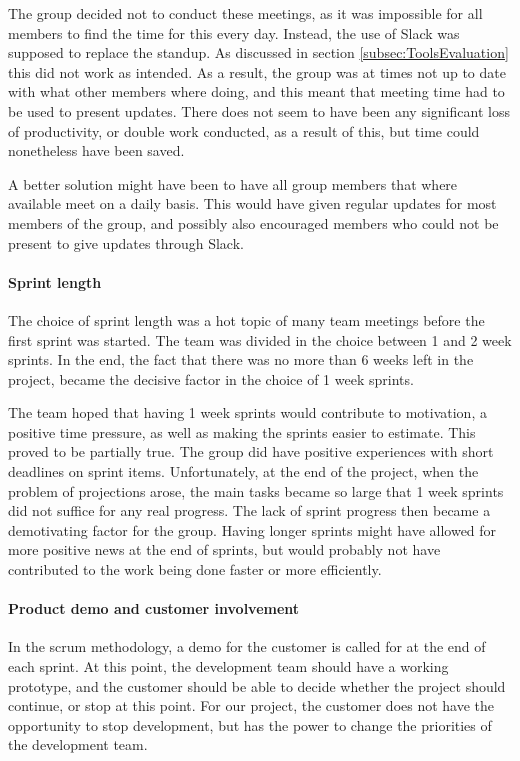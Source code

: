 \documentclass[11pt,a4paper,titlepage,oneside]{report}
\begin{document}
The group decided not to conduct these meetings, as it was impossible for all members to find the time for this every day. Instead, the use of Slack was supposed to replace the standup. As discussed in section \ref{subsec:ToolsEvaluation} this did not work as intended. As a result, the group was at times not up to date with what other members where doing, and this meant that meeting time had to be used to present updates. There does not seem to have been any significant loss of productivity, or double work conducted, as a result of this, but time could nonetheless have been saved. 

A better solution might have been to have all group members that where available meet on a daily basis. This would have given regular updates for most members of the group, and possibly also encouraged members who could not be present to give updates through Slack. 

\paragraph{Sprint length}
The choice of sprint length was a hot topic of many team meetings before the first sprint was started. The team was divided in the choice between 1 and 2 week sprints. In the end, the fact that there was no more than 6 weeks left in the project, became the decisive factor in the choice of 1 week sprints. 

The team hoped that having 1 week sprints would contribute to motivation, a positive time pressure, as well as making the sprints easier to estimate. This proved to be partially true. The group did have positive experiences with short deadlines on sprint items. Unfortunately, at the end of the project, when the problem of projections arose, the main tasks became so large that 1 week sprints did not suffice for any real progress. The lack of sprint progress then became a demotivating factor for the group. Having longer sprints might have allowed for more positive news at the end of sprints, but would probably not have contributed to the work being done faster or more efficiently. 

\paragraph{Product demo and customer involvement}
In the scrum methodology, a demo for the customer is called for at the end of each sprint. At this point, the development team should have a working prototype, and the customer should be able to decide whether the project should continue, or stop at this point. For our project, the customer does not have the opportunity to stop development, but has the power to change the priorities of the development team.
\end{document}
